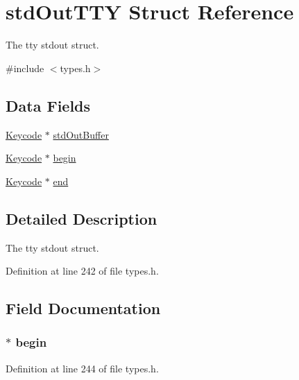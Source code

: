 \hypertarget{structstd_out_t_t_y}{
\section{stdOutTTY Struct Reference}
\label{structstd_out_t_t_y}
}


The tty stdout struct.  




{\ttfamily \#include $<$types.h$>$}

\subsection*{Data Fields}
\begin{DoxyCompactItemize}
\item 
\hyperlink{types_8h_a90ed3c9028a7fa45665d10b5210fa142}{Keycode} $\ast$ \hyperlink{structstd_out_t_t_y_aef253d03c960d4ee76bc0f0f84236f8b}{stdOutBuffer}
\item 
\hyperlink{types_8h_a90ed3c9028a7fa45665d10b5210fa142}{Keycode} $\ast$ \hyperlink{structstd_out_t_t_y_a07f2fe2975e6c3ee1e728566ec50cfab}{begin}
\item 
\hyperlink{types_8h_a90ed3c9028a7fa45665d10b5210fa142}{Keycode} $\ast$ \hyperlink{structstd_out_t_t_y_a69c1bb32d9b06f32161aff7f1c822c97}{end}
\end{DoxyCompactItemize}


\subsection{Detailed Description}
The tty stdout struct. 

Definition at line 242 of file types.h.



\subsection{Field Documentation}
\hypertarget{structstd_out_t_t_y_a07f2fe2975e6c3ee1e728566ec50cfab}{
\subsubsection[{begin}]{$\ast$ {\bf begin}}}
\label{structstd_out_t_t_y_a07f2fe2975e6c3ee1e728566ec50cfab}


Definition at line 244 of file types.h.

